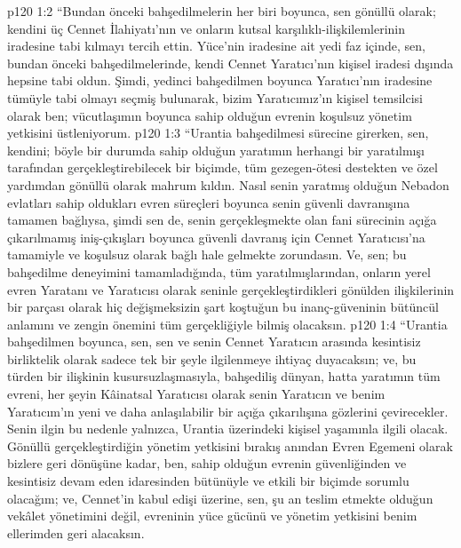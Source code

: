 \vs p120 1:2 “Bundan önceki bahşedilmelerin her biri boyunca, sen gönüllü olarak; kendini üç Cennet İlahiyatı’nın ve onların kutsal karşılıklı\hyp{}ilişkilemlerinin iradesine tabi kılmayı tercih ettin. Yüce’nin iradesine ait yedi faz içinde, sen, bundan önceki bahşedilmelerinde, kendi Cennet Yaratıcı’nın kişisel iradesi dışında hepsine tabi oldun. Şimdi, yedinci bahşedilmen boyunca Yaratıcı’nın iradesine tümüyle tabi olmayı seçmiş bulunarak, bizim Yaratıcımız’ın kişisel temsilcisi olarak ben; vücutlaşımın boyunca sahip olduğun evrenin koşulsuz yönetim yetkisini üstleniyorum.
\vs p120 1:3 “Urantia bahşedilmesi sürecine girerken, sen, kendini; böyle bir durumda sahip olduğun yaratımın herhangi bir yaratılmışı tarafından gerçekleştirebilecek bir biçimde, tüm gezegen\hyp{}ötesi destekten ve özel yardımdan gönüllü olarak mahrum kıldın. Nasıl senin yaratmış olduğun Nebadon evlatları sahip oldukları evren süreçleri boyunca senin güvenli davranışına tamamen bağlıysa, şimdi sen de, senin gerçekleşmekte olan fani sürecinin açığa çıkarılmamış iniş\hyp{}çıkışları boyunca güvenli davranış için Cennet Yaratıcısı’na tamamiyle ve koşulsuz olarak bağlı hale gelmekte zorundasın. Ve, sen; bu bahşedilme deneyimini tamamladığında, tüm yaratılmışlarından, onların yerel evren Yaratanı ve Yaratıcısı olarak seninle gerçekleştirdikleri gönülden ilişkilerinin bir parçası olarak hiç değişmeksizin şart koştuğun bu inanç\hyp{}güveninin bütüncül anlamını ve zengin önemini tüm gerçekliğiyle bilmiş olacaksın.
\vs p120 1:4 “Urantia bahşedilmen boyunca, sen, sen ve senin Cennet Yaratıcın arasında kesintisiz birliktelik olarak sadece tek bir şeyle ilgilenmeye ihtiyaç duyacaksın; ve, bu türden bir ilişkinin kusursuzlaşmasıyla, bahşediliş dünyan, hatta yaratımın tüm evreni, her şeyin Kâinatsal Yaratıcısı olarak senin Yaratıcın ve benim Yaratıcım’ın yeni ve daha anlaşılabilir bir açığa çıkarılışına gözlerini çevirecekler. Senin ilgin bu nedenle yalnızca, Urantia üzerindeki kişisel yaşamınla ilgili olacak. Gönüllü gerçekleştirdiğin yönetim yetkisini bırakış anından Evren Egemeni olarak bizlere geri dönüşüne kadar, ben, sahip olduğun evrenin güvenliğinden ve kesintisiz devam eden idaresinden bütünüyle ve etkili bir biçimde sorumlu olacağım; ve, Cennet’in kabul edişi üzerine, sen, şu an teslim etmekte olduğun vekâlet yönetimini değil, evreninin yüce gücünü ve yönetim yetkisini benim ellerimden geri alacaksın.

